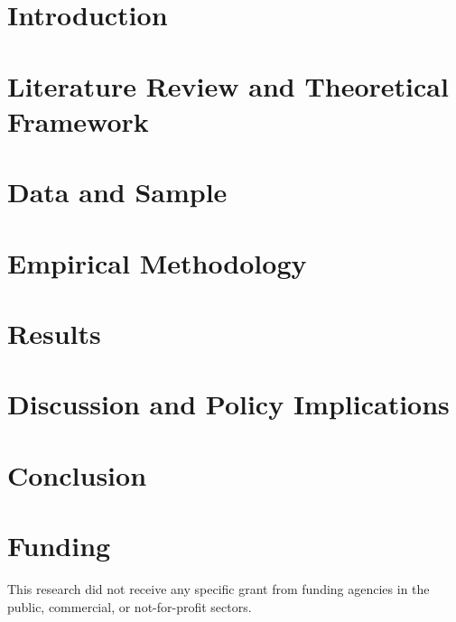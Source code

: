\documentclass[preprint,review,12pt,authoryear]{styles/elsarticle}
\begin{document}
\section{Introduction}
\label{sec:introduction}


\section{Literature Review and Theoretical Framework}
\label{sec:literature}


\section{Data and Sample}
\label{sec:data}


\section{Empirical Methodology}
\label{sec:methodology}


\section{Results}
\label{sec:results}


\section{Discussion and Policy Implications}
\label{sec:discussion}


\section{Conclusion}
\label{sec:conclusion}





\section*{Funding}
This research did not receive any specific grant from funding agencies in the
public, commercial, or not-for-profit sectors.
\end{document}
